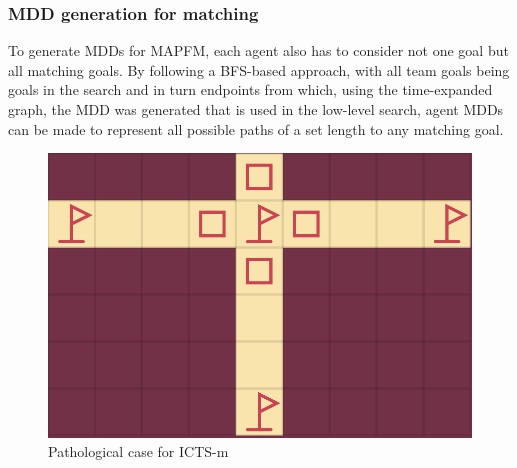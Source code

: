 \documentclass[english,10pt]{article}
\begin{document}
	\subsubsection{MDD generation for matching}
	To generate MDDs for MAPFM, each agent also has to consider not one goal but all matching goals. By following a BFS-based approach, with all team goals being goals in the search and in turn endpoints from which, using the time-expanded graph, the MDD was generated that is used in the low-level search, agent MDDs can be made to represent all possible paths of a set length to any matching goal.
	\begin{figure}
		\centering
		\includegraphics[width=\linewidth]{img/path}
		\caption{Pathological case for ICTS-m}
		\label{fig:path}
	\end{figure}
\end{document}
